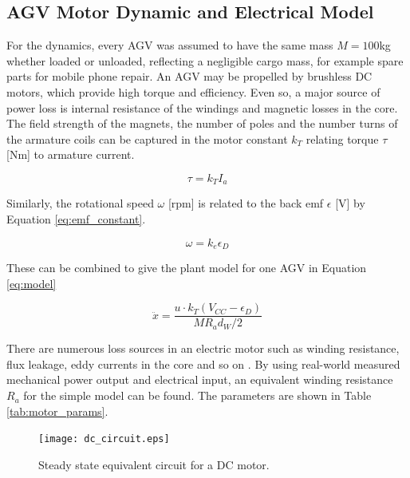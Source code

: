 \subsection{AGV Motor Dynamic and Electrical Model}
For the dynamics, every AGV was assumed to have the same mass $M=100$kg whether loaded or unloaded, reflecting a negligible cargo mass, for example spare parts for mobile phone repair. An AGV may be propelled by brushless DC motors, which provide high torque and efficiency. Even so, a major source of power loss is internal resistance of the windings and magnetic losses in the core.  %
The field strength of the magnets, the number of poles and the number turns of the armature coils can be captured in the motor constant $k_T $ relating torque $\tau$ [Nm] to armature current.

\begin{equation}
\tau = k_T I_a
\label{eq:torque_constant}
\end{equation} 

Similarly, the rotational speed $\omega$ [rpm] is related to the back emf $\epsilon$ [V] by Equation \ref{eq:emf_constant}.

\begin{equation}
\omega = {k_e}\epsilon_D 
\label{eq:emf_constant}
\end{equation}

These can be combined to give the plant model for one AGV in Equation \ref{eq:model}

\begin{equation}
\ddot{x} =\frac{ u \cdot k_T (V_{CC} - \epsilon_D) }{M R_a d_W/2}
\label{eq:model}
\end{equation}

 There are numerous loss sources in an electric motor such as winding resistance, flux leakage, eddy currents in the core and so on \cite{Sarlioglu2016}. By using real-world measured mechanical power output and electrical input, an equivalent winding resistance $R_a$ for the simple model can be found. The parameters are shown in Table \ref{tab:motor_params}.

\begin{figure}[ht]
	\centering
	\texttt{[image: dc\_circuit.eps]}
	\caption{Steady state equivalent circuit for a DC motor.}
	\label{fig:dc_circuit}
\end{figure}


